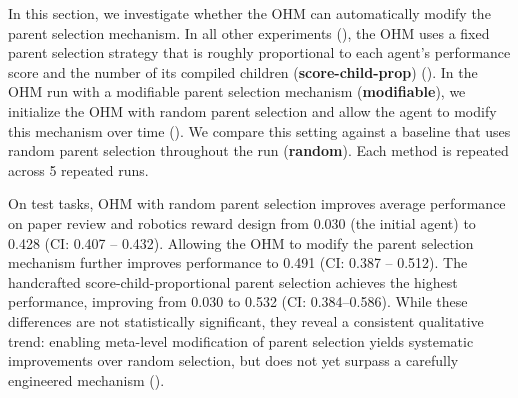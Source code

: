 \documentclass[]{fairmeta}
\begin{document}
In this section, we investigate whether the OHM can automatically modify the parent selection mechanism. In all other experiments (), the OHM uses a fixed parent selection strategy that is roughly proportional to each agent's performance score and the number of its compiled children (\textbf{score-child-prop}) (). In the OHM run with a modifiable parent selection mechanism (\textbf{modifiable}), we initialize the OHM with random parent selection and allow the agent to modify this mechanism over time (). We compare this setting against a baseline that uses random parent selection throughout the run (\textbf{random}). Each method is repeated across 5 repeated runs.

On test tasks, OHM with random parent selection improves average performance on paper review and robotics reward design from 0.030 (the initial agent) to 0.428 (CI: 0.407 -- 0.432). Allowing the OHM to modify the parent selection mechanism further improves performance to 0.491 (CI: 0.387 -- 0.512). The handcrafted score-child-proportional parent selection achieves the highest performance, improving from 0.030 to 0.532 (CI: 0.384--0.586). While these differences are not statistically significant, they reveal a consistent qualitative trend: enabling meta-level modification of parent selection yields systematic improvements over random selection, but does not yet surpass a carefully engineered mechanism ().
\end{document}
